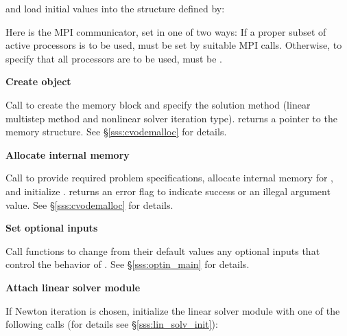 \begin{Steps}
  and load initial values into the structure defined by:

  {\s} 

  {\p} 

  Here  is the MPI communicator, set in one of two ways: 
  If a proper subset of active processors is to be used,  
  must be set by suitable MPI calls. Otherwise, to specify that all 
  processors are to be used,  must be .
  
\item\label{i:cvode_create} 
  {\bf Create {\cvode} object}

  Call  
  to create the {\cvode} memory block and specify the solution method
  (linear multistep method and nonlinear solver iteration type).
   returns a pointer to the {\cvode} memory structure.
  See \S\ref{sss:cvodemalloc} for details.

\item\label{i:cvode_malloc} 
  {\bf Allocate internal memory}

  Call  
  to provide required problem specifications,
  allocate internal memory for {\cvode}, 
  and initialize {\cvode}.
   returns an error flag to indicate success or an illegal
  argument value.  See \S\ref{sss:cvodemalloc} for details.
  
\item
  {\bf Set optional inputs}

  Call  functions to change from their default values any
  optional inputs that control the behavior of {\cvode}.
  See \S\ref{sss:optin_main} for details.

\item\label{i:lin_solver} 
  {\bf Attach linear solver module}

  If Newton iteration is chosen, initialize the linear solver module
  with one of the following calls (for details see \S\ref{sss:lin_solv_init}):

  {\s} 

  {\s} 


  
  
  

\end{Steps}

